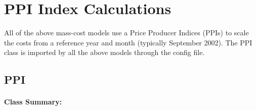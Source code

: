 \documentclass[letterpaper,10pt,openany,oneside]{sphinxmanual}
\begin{document}
\section{PPI Index Calculations}
\label{documentation:ppi-index-calculations}
All of the above mass-cost models use a Price Producer Indices (PPIs) to scale the costs from a reference year and month (typically September 2002).  The PPI class is imported by all the above models through the config file.


\subsection{PPI}
\label{documentation:ppi-class-label}\label{documentation:ppi}\paragraph{Class Summary:}
\end{document}
